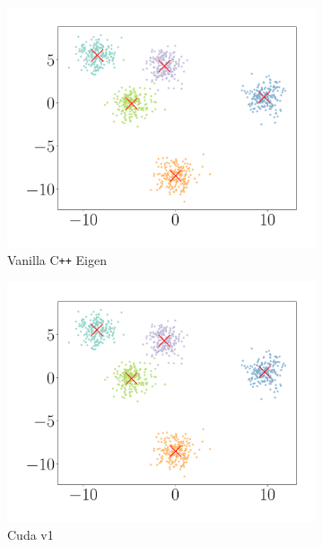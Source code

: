 \documentclass{article}
\begin{document}
\begin{figure}[H]
\begin{subfigure}[b]{0.32\linewidth}
      \includegraphics[scale=0.25]{figures/eigcc1K.pdf}
      \caption{\sc Vanilla C{\tt++} Eigen}
    \end{subfigure}
    \begin{subfigure}[b]{0.32\linewidth}
      \centering
      \includegraphics[scale=0.25]{figures/gpu1cc1K.pdf}
      \caption{\sc Cuda v1}
    \end{subfigure}
    \begin{subfigure}[b]{0.32\linewidth}
      \centering

\end{subfigure}
\end{figure}
\end{document}
